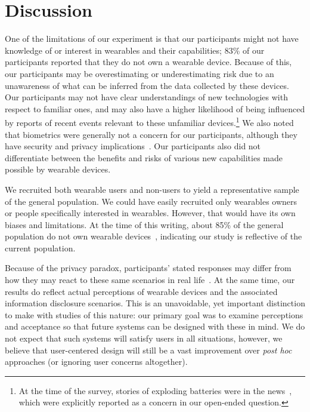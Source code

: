 \documentclass[conference]{IEEEtran}
\begin{document}
\section{Discussion}

One of the limitations of our experiment is that our participants might not have knowledge of or interest in wearables and their capabilities; 83\% of our participants reported that they do not own a wearable device. Because of this, our participants may be overestimating or underestimating risk due to an unawareness of what can be inferred from the data collected by these devices. Our participants may not have clear understandings of new technologies with respect to familiar ones, and may also have a higher likelihood of being influenced by reports of recent events relevant to these unfamiliar devices.\footnote{At the time of the survey, stories of exploding batteries were in the news~\cite{1_levin_2014}, which were explicitly reported as a concern in our open-ended question.}  We also noted that biometrics were generally not a concern for our participants, although they have security and privacy implications~\cite{prabhakar2003biometric}. Our participants also did not differentiate between the benefits and risks of various new capabilities made possible by wearable devices.

We recruited both wearable users and non-users to yield a representative sample of the general population. We could have easily recruited only wearables owners or people specifically interested in wearables. However, that would have its own biases and limitations. At the time of this writing, about 85\% of the general population do not own wearable devices~\cite{Nilsen,WearableStatNews}, indicating our study is reflective of the current population. 

Because of the privacy paradox, participants' stated responses may differ from how they may react to these same scenarios in real life~\cite{norberg2007privacy, jensen2005privacy}. At the same time, our results do reflect actual perceptions of wearable devices and the associated information disclosure scenarios. This is an unavoidable, yet important distinction to make with studies of this nature: our primary goal was to examine perceptions and acceptance so that future systems can be designed with these in mind. We do not expect that such systems will satisfy users in all situations, however, we believe that user-centered design will still be a vast improvement over {\it post hoc} approaches (or ignoring user concerns altogether). 
\end{document}
